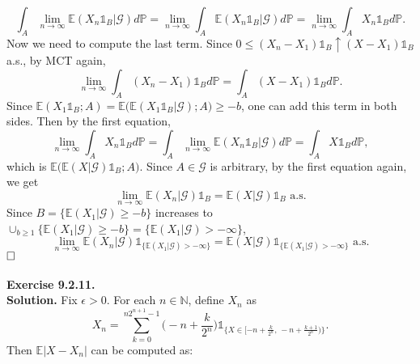 \documentclass[12pt]{extarticle}
\begin{document}
\begin{equation*}
\int_A \lim_{n\rightarrow\infty}\mathbb{E}(X_n\mathds{1}_B|\mathcal{G}) d\mathbb{P}=\lim_{n\rightarrow\infty}\int_A \mathbb{E}(X_n\mathds{1}_B|\mathcal{G})d\mathbb{P}=\lim_{n\rightarrow\infty}\int_A X_n\mathds{1}_Bd\mathbb{P}.
\end{equation*}
Now we need to compute the last term. Since $0\leq(X_n-X_1)\mathds{1}_B\uparrow(X-X_1)\mathds{1}_B$ a.s., by MCT again,
\begin{equation*}
\lim_{n\rightarrow\infty}\int_A(X_n-X_1)\mathds{1}_B d\mathbb{P}=\int_A(X-X_1)\mathds{1}_B d\mathbb{P}.
\end{equation*}
Since $\mathbb{E}(X_1\mathds{1}_B;A)=\mathbb{E}\big(\mathbb{E}(X_1\mathds{1}_B|\mathcal{G}); A\big)\geq -b$, one can add this term in both sides. Then by the first equation,
\begin{equation*}
\lim_{n\rightarrow\infty}\int_AX_n\mathds{1}_B d\mathbb{P}
=
\int_A\lim_{n\rightarrow\infty}\mathbb{E}(X_n\mathds{1}_B|\mathcal{G})d\mathbb{P}
=\int_A X\mathds{1}_B d\mathbb{P},
\end{equation*}
which is $\mathbb{E}\big(\mathbb{E}(X|\mathcal{G})\mathds{1}_B;A\big)$. Since $A\in\mathcal{G}$ is arbitrary, by the first equation again, we get
\begin{equation*}
\lim_{n\rightarrow\infty}\mathbb{E}(X_n|\mathcal{G})\mathds{1}_B=\mathbb{E}(X|\mathcal{G})\mathds{1}_B\text{ a.s.}
\end{equation*}
Since $B = \{\mathbb{E}(X_1|\mathcal{G})\geq -b\}$ increases to $\cup_{b\geq 1}\{\mathbb{E}(X_1|\mathcal{G})\geq -b\}=\{\mathbb{E}(X_1|\mathcal{G})>-\infty\}$,
\begin{equation*}
\lim_{n\rightarrow\infty}\mathbb{E}(X_n|\mathcal{G})\mathds{1}_{\{\mathbb{E}(X_1|\mathcal{G})>-\infty\}}=\mathbb{E}(X|\mathcal{G})\mathds{1}_{\{\mathbb{E}(X_1|\mathcal{G})>-\infty\}}\text{ a.s.}
\end{equation*}
$\hspace{\fill}\square$
\\ \\
\textbf{Exercise 9.2.11.}\\
\textbf{Solution.} Fix $\epsilon>0$. For each $n\in\mathbb{N}$, define $X_n$ as
\begin{equation*}
X_n=\sum_{k=0}^{n2^{n+1}-1}\Big(-n+\frac{k}{2^n}\Big)\mathds{1}_{\{X\in[-n+\frac{k}{2^n},\,-n+\frac{k+1}{2^n})\}}.
\end{equation*}
Then $\mathbb{E}|X-X_n|$ can be computed as:
\end{document}
